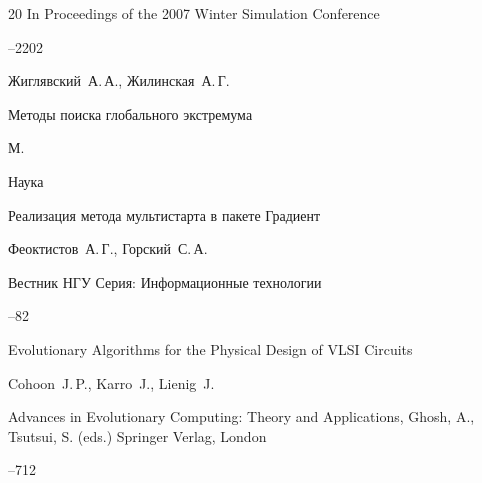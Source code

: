 \begin{thebibliography}{20}
\jour In Proceedings of the 2007 Winter Simulation Conference


--2202





\by Жиглявский~А.\,А., Жилинская~А.\,Г.

\book Методы поиска глобального экстремума

\publaddr М.

\publ Наука







\paper Реализация метода мультистарта в пакете Градиент

\by Феоктистов~А.\,Г., Горский~С.\,А.

\jour Вестник НГУ Серия: Информационные технологии




--82





\paper Evolutionary Algorithms for the Physical Design of VLSI Circuits

\by Cohoon~J.\,P., Karro~J., Lienig~J.

\jour Advances in Evolutionary Computing: Theory and Applications, Ghosh, A., Tsutsui, S. (eds.) Springer Verlag, London


--712





\end{thebibliography}
